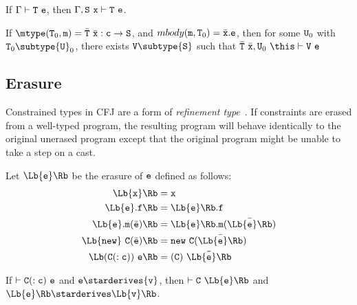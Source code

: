 \begin{lemma}[Weakening]
If $\Gamma \vdash {\tt T}\ {\tt e}$, then $\Gamma, {\tt S}\ {\tt x}\vdash {\tt T}\ {\tt e}$.
\end{lemma}

\begin{lemma}
If $\mtype({\tt T}_0,{\tt m})=\bar{\tt T}\ \bar{\tt x} : {\tt c}
\rightarrow {\tt S}$, and $mbody({\tt m}, {\tt T}_0)=\bar{\tt x}.{\tt
e}$, then for some ${\tt U}_0$ with ${\tt T}_0 \subtype {\tt U}_0$,
there exists ${\tt V}\subtype {\tt S}$ such that
$\bar{\tt T}\ \bar{\tt x},{\tt U}_0\ \this \vdash {\tt V}\ {\tt e}$
\end{lemma}


\subsection{Erasure}

Constrained types in CFJ are a form of {\em refinement
type}~\cite{refinement-types}.  If constraints are erased from a
well-typed program,
the resulting program will behave identically to the original unerased
program except that the original program might be unable to take
a step on a cast.

Let $\Lb {\tt e} \Rb$ be the erasure of ${\tt e}$ defined as follows:
\begin{align*}
\Lb {\tt x} \Rb &= {\tt x} \\
\Lb {\tt e}.{\tt f} \Rb &= \Lb {\tt e} \Rb.{\tt f} \\
\Lb {\tt e}.{\tt m}(\bar{\tt e}) \Rb &= \Lb {\tt e} \Rb.{\tt m}(\bar{\Lb {\tt e} \Rb}) \\
\Lb {\tt new}~{\tt C}(\bar{\tt e}) \Rb &= {\tt new}~{\tt C}(\bar{\Lb {\tt e} \Rb}) \\
\Lb ({\tt C}(:{\tt c}))~{\tt e} \Rb &= (\tt C)~\bar{\Lb {\tt e} \Rb}
\end{align*}

\begin{theorem}[Erasure]

If $\vdash {\tt C}(:{\tt c})\ {\tt e}$ and ${\tt e} \starderives {\tt v}$,
then $\vdash {\tt C}\ \Lb {\tt e} \Rb$ and $\Lb
{\tt e} \Rb \starderives \Lb {\tt v} \Rb$.

\end{theorem}


